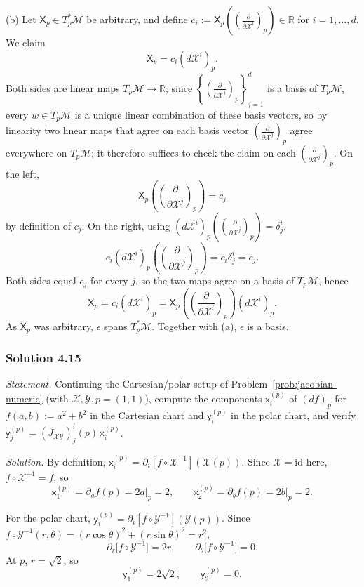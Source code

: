 \documentclass[11pt]{article}
\begin{document}
(b) Let $\mathsf X_p\in T_p^*\mathcal M$ be arbitrary, and define
$c_i:=\mathsf X_p\!\left(\left(\frac{\partial}{\partial\mathcal
X^i}\right)_p\right)\in\mathbb R$ for $i=1,\dots,d$. We claim
\[
\mathsf X_p = c_i(d\mathcal X^i)_p.
\]
Both sides are linear maps $T_p\mathcal M\to\mathbb R$; since
$\left\{\left(\frac{\partial}{\partial\mathcal
X^j}\right)_p\right\}_{j=1}^d$ is a basis of $T_p\mathcal M$, every
$w\in T_p\mathcal M$ is a unique linear combination of these basis vectors,
so by linearity two linear maps that agree on each basis vector
$\left(\frac{\partial}{\partial\mathcal X^j}\right)_p$ agree everywhere on
$T_p\mathcal M$; it therefore suffices to check the claim on each
$\left(\frac{\partial}{\partial\mathcal X^j}\right)_p$. On the left,
\[
\mathsf X_p\!\left(\left(\frac{\partial}{\partial\mathcal
X^j}\right)_p\right) = c_j
\]
by definition of $c_j$. On the right, using $(d\mathcal
X^i)_p\!\left(\left(\frac{\partial}{\partial\mathcal
X^j}\right)_p\right)=\delta^i_j$,
\[
c_i(d\mathcal X^i)_p\!\left(\left(\frac{\partial}{\partial
\mathcal X^j}\right)_p\right) = c_i\delta^i_j = c_j.
\]
Both sides equal $c_j$ for every $j$, so the two maps agree on a basis of
$T_p\mathcal M$, hence
\[
\mathsf X_p = c_i(d\mathcal X^i)_p = \mathsf
X_p\!\left(\left(\frac{\partial}{\partial\mathcal
X^i}\right)_p\right)(d\mathcal X^i)_p.
\]
As $\mathsf X_p$ was arbitrary, $\epsilon$ spans $T_p^*\mathcal M$.
Together with (a), $\epsilon$ is a basis.

\subsubsection*{Solution 4.15}

\noindent\textit{Statement.} Continuing the Cartesian/polar setup of
Problem~\ref{prob:jacobian-numeric} (with $\mathcal X,\mathcal Y,
p=(1,1)$), compute the components $\mathsf x_i^{(p)}$ of $(df)_p$ for
$f(a,b):=a^2+b^2$ in the Cartesian chart and $\mathsf y_i^{(p)}$ in the
polar chart, and verify $\mathsf y_j^{(p)}=
(J_{\mathcal{XY}})^i_j(p)\,\mathsf x_i^{(p)}$.

\medskip
\noindent\textit{Solution.} By definition, $\mathsf x_i^{(p)}=\partial_i[
f\circ\mathcal X^{-1}](\mathcal X(p))$. Since $\mathcal X=\mathrm{id}$
here, $f\circ\mathcal X^{-1}=f$, so
\[
\mathsf x_1^{(p)} = \partial_af(p) = 2a\big|_p = 2, \qquad \mathsf
x_2^{(p)} = \partial_bf(p) = 2b\big|_p = 2.
\]

For the polar chart, $\mathsf y_i^{(p)}=\partial_i[f\circ\mathcal
Y^{-1}](\mathcal Y(p))$. Since $f\circ\mathcal
Y^{-1}(r,\theta)=(r\cos\theta)^2+(r\sin\theta)^2=r^2$,
\[
\partial_r\big[f\circ\mathcal Y^{-1}\big] = 2r, \qquad \partial_\theta
\big[f\circ\mathcal Y^{-1}\big] = 0.
\]
At $p$, $r=\sqrt2$, so
\[
\mathsf y_1^{(p)} = 2\sqrt2, \qquad \mathsf y_2^{(p)} = 0.
\]
\end{document}
